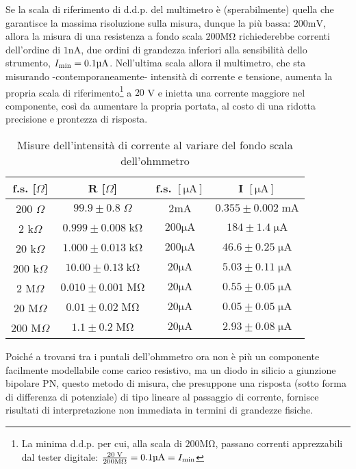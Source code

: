 \documentclass{article}[a4paper, oneside ,11pt]
\begin{document}
Se la scala di riferimento di d.d.p. del multimetro è (sperabilmente) quella che garantisce la massima risoluzione sulla misura, dunque la più bassa: $200 \si{\milli\volt}$, allora la misura di una resistenza a fondo scala $200 \si{\mega\ohm}$ richiederebbe correnti dell'ordine di $1 \si{\nano\ampere}$, due ordini di grandezza inferiori alla sensibilità dello strumento, $I_{\rm min}= 0.1 \si{\micro\ampere}$. Nell'ultima scala allora il multimetro, che sta misurando -contemporaneamente- intensità di corrente e tensione, aumenta la propria scala di riferimento\footnote{La minima d.d.p. per cui, alla scala di $200 \si{\mega\ohm}$, passano correnti apprezzabili dal tester digitale: $\frac{20 \; \si{\volt}}{200 \si{\mega\ohm}} = 0.1 \si{\micro\ampere} = I_{\rm min}$} a $20$ V  e inietta una corrente maggiore nel componente, così da aumentare la propria portata, al costo di una ridotta precisione e prontezza di risposta.
\begin{table}[!htbp]
	\begin{center}
		\begin{tabular}{cc|cc}
		\toprule	
		f.s. [$\Omega$]  & R [$\Omega$] & f.s. $[\si{\micro\A}]$ & I $[\si{\micro\A}]$							 \\
		\midrule
		\midrule
		200 $\Omega$ &	$99.9\pm 0.8 \; \Omega$ & $2\si{\milli\A}$ & $0.355\pm 0.002\; \si{\milli\A}$			 \\
		2 k$\Omega$  &	$0.999\pm 0.008 \; \si{\kilo\ohm}$	& $200\si{\micro\A}$ & $184\pm 1.4\; \si{\micro\A}$  \\
		20 k$\Omega$  &	$1.000\pm 0.013 \; \si{\kilo\ohm}$	& $200\si{\micro\A}$ & $46.6\pm 0.25\; \si{\micro\A}$\\
		200 k$\Omega$ & $10.00\pm 0.13 \; \si{\kilo\ohm}$ 	& $20\si{\micro\A}$	 & $5.03\pm 0.11\; \si{\micro\A}$\\
		2 M$\Omega$   & $0.010\pm 0.001 \; \si{\mega\ohm}$ & $20\si{\micro\A}$	 & $0.55\pm 0.05\; \si{\micro\A}$\\
		20 M$\Omega$  & $0.01\pm 0.02 \; \si{\mega\ohm}$	& $20\si{\micro\A}$	 & $0.05\pm 0.05\; \si{\micro\A}$\\
		200 M$\Omega$ & $1.1\pm 0.2 \; \si{\mega\ohm}$ 	& $20\si{\micro\A}$	 & $2.93\pm 0.08\; \si{\micro\A}$	 \\
		\bottomrule        
		\end{tabular}
		\caption{Misure dell'intensità di corrente al variare del fondo scala dell'ohmmetro \label{tab: res}}
	\end{center}
\end{table}
Poiché a trovarsi tra i puntali dell'ohmmetro ora non è più un componente facilmente modellabile come carico resistivo, ma un diodo in silicio a giunzione bipolare PN, questo metodo di misura, che presuppone una risposta (sotto forma di differenza di potenziale) di tipo lineare al passaggio di corrente, fornisce risultati di interpretazione non immediata in termini di grandezze fisiche.\\
\end{document}
